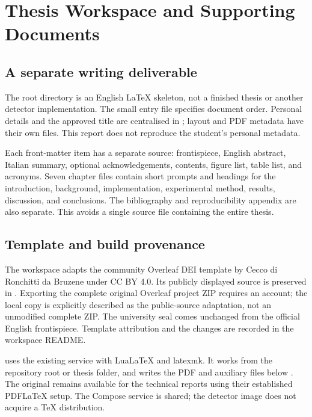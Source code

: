 \section{Thesis Workspace and Supporting Documents}

\subsection{A separate writing deliverable}

The root  directory is an English LaTeX skeleton, not a finished
thesis or another detector implementation. The small  entry
file specifies document order. Personal details and the approved title are
centralised in ; layout and PDF metadata have their own
files. This report does not reproduce the student's personal metadata.

Each front-matter item has a separate source: frontispiece, English abstract,
Italian summary, optional acknowledgements, contents, figure list, table list,
and acronyms. Seven chapter files contain short prompts and headings for the
introduction, background, implementation, experimental method, results,
discussion, and conclusions. The bibliography and reproducibility appendix are
also separate. This avoids a single source file containing the entire thesis.

\subsection{Template and build provenance}

The workspace adapts the community Overleaf DEI template by
Cecco di Ronchitti da Bruzene under CC BY 4.0. Its publicly displayed source is
preserved in . Exporting the complete original
Overleaf project ZIP requires an account; the local copy is explicitly
described as the public-source adaptation, not an unmodified complete ZIP.
The university seal comes unchanged from the official English frontispiece.
Template attribution and the changes are recorded in the workspace README.

 uses the existing  service
with LuaLaTeX and latexmk. It works from the repository root or thesis folder,
and writes the PDF and auxiliary files below .
The original  remains available for the technical
reports using their established PDFLaTeX setup. The Compose service is shared;
the detector image does not acquire a TeX distribution.

